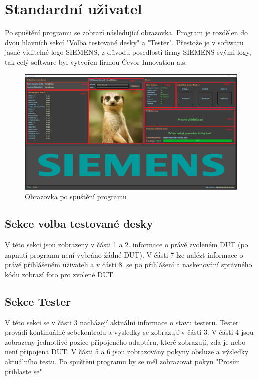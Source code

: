 \section{Standardní uživatel}
Po spuštění programu se zobrazí následující obrazovka.
Program je rozdělen do dvou hlavních sekcí "Volba testované desky" a  "Tester". Přestože je v softwaru 
jasně viditelné logo SIEMENS, z důvodu posedlosti firmy SIEMENS svými logy,
tak celý software byl vytvořen firmou Čevor Innovation a.s.

\begin{figure}[ht!]
	\centering
	\includegraphics[width = 1\textwidth]{obrazky/LOGIN_EDITED.png}
    \caption{Obrazovka po spuštění programu}
\end{figure}

\subsection{Sekce volba testované desky}
V této sekci jsou zobrazeny v části 1 a 2. informace o právě zvoleném DUT (po zapnutí programu není vybráno žádné DUT). V části 7 
lze nalézt informace o právě přihlášeném uživateli a v části 8. se po přihlášení a naskenování správného
kódu zobrazí foto pro zvolené DUT.

\subsection{Sekce Tester}
V této sekci se v části 3 nacházejí aktuální informace o stavu testeru.
Tester provádí kontinuálně sebekontrolu a výsledky se zobrazují v části 3.
V části 4 jsou zobrazeny jednotlivé pozice připojeného adaptéru, které zobrazují,
zda je nebo není připojena DUT. V části 5 a 6 jsou zobrazovány pokyny obsluze a výsledky aktuálního testu.
Po spuštění programu by se měl zobrazovat pokyn "Prosím přihlaste se".

